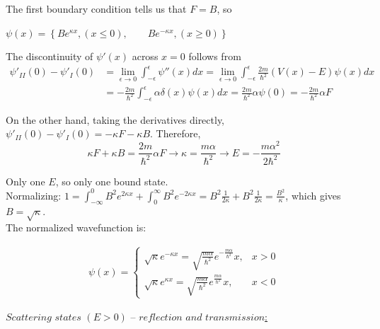 The first boundary condition tells us that $F=B$, so

$\psi(x) = \left\{ Be^{\kappa x}, (x \leq 0), \qquad Be^{-\kappa x}, (x \geq 0) \right\}$


The discontinuity of $\psi'(x)$ across $x=0$ follows from 
\begin{align*}
    \psi'_{II}(0) - \psi'_{I}(0) 
    &= \lim_{\epsilon \rightarrow 0} \int_{-\epsilon}^{\epsilon} \psi''(x) dx = \lim_{\epsilon \rightarrow 0} \int_{-\epsilon}^{\epsilon} \frac{2m}{\hbar^2} (V(x) - E) \psi(x) dx \\
    &= - \frac{2m}{\hbar^2} \int_{-\epsilon}^{\epsilon} \alpha \delta(x) \psi(x) dx = \frac{2m}{\hbar^2} \alpha \psi(0) = - \frac{2m}{\hbar^2} \alpha F
\end{align*}

On the other hand, taking the derivatives directly, $\psi'_{II}(0) - \psi'_{I}(0) = -\kappa F - \kappa B$. Therefore,
    $$\kappa F + \kappa B = \frac{2m}{\hbar^2} \alpha F \rightarrow \kappa = \frac{m \alpha}{\hbar^2} \rightarrow E = - \frac{m \alpha^2}{2 \hbar^2}$$

Only one $E$, so only one bound state. \\
Normalizing: $1 = \int_{-\infty}^{0} B^2 e^{2 \kappa x} + \int_{0}^{\infty} B^2 e^{-2 \kappa x} = B^2 \frac{1}{2 \kappa} + B^2 \frac{1}{2 \kappa} = \frac{B^2}{\kappa}$, which gives $B = \sqrt{\kappa}$. \\

The normalized wavefunction is: 

\begin{align*}
\psi(x) = 
    \begin{cases} 
        \sqrt{\kappa} e^{-\kappa x} = \sqrt{\frac{m\alpha}{\hbar^2}} e^{-\frac{m\alpha}{\hbar^2}} x, & x > 0 \\ 
        \sqrt{\kappa} e^{\kappa x} = \sqrt{\frac{m\alpha}{\hbar^2}} e^{\frac{m \alpha}{\hbar^2}} x, & x < 0
    \end{cases}
\end{align*}

\underline{$\textit{Scattering states } (E > 0) \textit{ -- reflection and transmission}$:} \\

